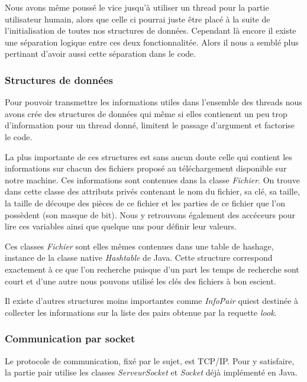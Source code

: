 Nous avons même poussé le vice jusqu'à utiliser un thread pour la
partie utilisateur humain, alors que celle ci pourrai juste être placé
à la suite de l'initialisation de toutes nos structures de
données. Cependant là encore il existe une séparation logique entre
ces deux fonctionnalitée. Alors il nous a semblé plus pertinant
d'avoir aussi cette séparation dans le code.

\subsubsection{Structures de données}
Pour pouvoir transmettre les informations utiles dans l'ensemble des
threads nous avons crée des structures de données qui même si elles
contienent un peu trop d'information pour un thread donné, limitent le
passage d'argument et factorise le code.

La plus importante de ces structures est sans aucun doute celle qui
contient les informations sur chacun des fichiers proposé au
téléchargement disponible sur notre machine. Ces informations sont
contenues dans la classe \textit{Fichier}. On trouve dans cette classe
des attributs privés contenant le nom du fichier, sa clé, sa taille,
la taille de découpe des pièces de ce fichier et les parties de ce
fichier que l'on possèdent (son masque de bit). Nous y retrouvons
également des accéceurs pour lire ces variables ainsi que quelque uns
pour définir leur valeurs. 

Ces classes \textit{Fichier} sont elles mêmes contenues dans une table
de hashage, instance de la classe native \textit{Hashtable} de Java.
Cette structure correspond exactement à ce que l'on recherche puisque
d'un part les temps de recherche sont court et d'une autre nous
pouvons utilisé les clés des fichiers à bon escient.

Il existe d'autres structures moins importantes comme
\textit{InfoPair} quiest destinée à collecter les informations sur la
liste des pairs obtenue par la requette \textit{look}.



\subsubsection{Communication par socket}
Le protocole de communication, fixé par le sujet, est TCP/IP. Pour y
satisfaire, la partie pair utilise les classes \textit{ServeurSocket}
et \textit{Socket} déjà implémenté en Java.

